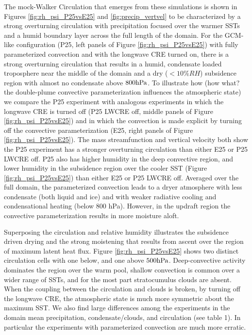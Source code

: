 \documentclass[11pt]{article}   	%
\begin{document}
The mock-Walker Circulation that emerges from these simulations is shown in Figures \ref{fig:rh_psi_P25vsE25} and 
\ref{fig:precip_vertvel} to be characterized by a strong overturning circulation with precipitation focused over the warmer 
SSTs and a humid boundary layer across the full length of the domain.   For the GCM-like configuration (P25, left panels 
of Figure \ref{fig:rh_psi_P25vsE25}) with fully parameterized convection and with the longwave CRE turned on, there is 
a strong overturning circulation that results in a humid, condensate loaded troposphere near the middle of the domain 
and a dry ($< 10\% RH$) subsidence region with almost no condensate above $800 \rm{hPa}$.    
To illustrate how (how what?  the double-plume convective parameterization influences the atmospheric state) 
we compare the P25 experiment with analogous experiments in which the longwave CRE is turned off (P25 LWCRE off, middle 
panels of Figure \ref{fig:rh_psi_P25vsE25}) and in which the convection is made explicit by turning off the convective 
parameterization (E25, right panels of Figure \ref{fig:rh_psi_P25vsE25}).  
The mass streamfunction and vertical velocity both show the P25 experiment has a stronger overturning circulation 
than either E25 or P25 LWCRE off.  P25 also has higher humidity in the deep convective region, and lower humidity in 
the subsidence region over the 
cooler SST (Figure \ref{fig:rh_psi_P25vsE25}) than either E25 or P25 LWCRE off.  Averaged over the full domain, 
the parameterized convection leads to a dryer atmosphere with less 
condensate (both liquid and ice) and with weaker radiative cooling and condensational heating (below 800 hPa).  However, in 
the updraft region the convective parameterization results in more moisture aloft.      

Superposing the circulation and relative humidity illustrates the subsidence driven 
drying and the strong moistening that results from ascent over the region of maximum latent heat flux.  
Figure \ref{fig:rh_psi_P25vsE25} shows two distinct circulation cells with one below, and one above $500 \rm{hPa}$.  
Deep-convective activity dominates the 
region over the warm pool, shallow convection is common over a wider range of SSTs, and for the most part stratocumulus 
clouds are absent.  When the coupling between the circulation and clouds is broken, by turning off the longwave CRE, the atmospheric 
state is much more symmetric about the maximum SST.  We also find large differences among the experiments in the domain mean 
precipitation, condensate/clouds, and circulation (see table 1).  In particular the experiments with parameterized convection are 
much more erratic.   
\end{document}
